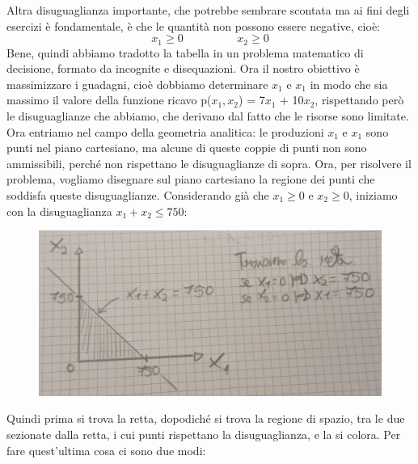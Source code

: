 \documentclass{article}
\begin{document}
Altra disuguaglianza importante, che potrebbe sembrare scontata ma ai fini degli esercizi è fondamentale, è che le quantità non possono essere negative, cioè:
\begin{equation*}
    x_1 \geq 0 \hspace{2cm} x_2 \geq 0
\end{equation*}
Bene, quindi abbiamo tradotto la tabella in un problema matematico di decisione, formato da incognite e disequazioni. Ora il nostro obiettivo è massimizzare i guadagni, cioè dobbiamo determinare $x_1$ e $x_1$ in modo che sia massimo il valore della funzione ricavo p($x_1,x_2$) = 7$x_1$ + 10$x_2$, rispettando però le disuguaglianze che abbiamo, che derivano dal fatto che le risorse sono limitate. Ora entriamo nel campo della geometria analitica: le produzioni $x_1$ e $x_1$ sono punti nel piano cartesiano, ma alcune di queste coppie di punti non sono ammissibili, perché non rispettano le disuguaglianze di sopra. Ora, per risolvere il problema, vogliamo disegnare sul piano cartesiano la regione dei punti che soddisfa queste disuguaglianze. Considerando già che $x_1 \geq 0$ e $x_2 \geq 0$, iniziamo con la disuguaglianza $x_1 + x_2 \leq 750$:
\begin{figure}[h!]
    \centering
    \includegraphics[scale=0.3]{retta1.jpeg}
\end{figure}
Quindi prima si trova la retta, dopodiché si trova la regione di spazio, tra le due sezionate dalla retta, i cui punti rispettano la disuguaglianza, e la si colora. Per fare quest'ultima cosa ci sono due modi:
\end{document}
